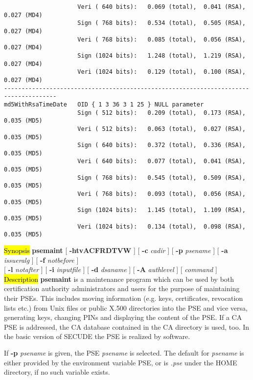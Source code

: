 {\begin{verbatim}
                     Veri ( 640 bits):   0.069 (total),  0.041 (RSA),  0.027 (MD4)  
                     Sign ( 768 bits):   0.534 (total),  0.505 (RSA),  0.027 (MD4)  
                     Veri ( 768 bits):   0.085 (total),  0.056 (RSA),  0.027 (MD4)  
                     Sign (1024 bits):   1.248 (total),  1.219 (RSA),  0.027 (MD4)  
                     Veri (1024 bits):   0.129 (total),  0.100 (RSA),  0.027 (MD4)  
-------------------------------------------------------------------------------------
md5WithRsaTimeDate   OID { 1 3 36 3 1 25 } NULL parameter
                     Sign ( 512 bits):   0.209 (total),  0.173 (RSA),  0.035 (MD5)  
                     Veri ( 512 bits):   0.063 (total),  0.027 (RSA),  0.035 (MD5)  
                     Sign ( 640 bits):   0.372 (total),  0.336 (RSA),  0.035 (MD5)  
                     Veri ( 640 bits):   0.077 (total),  0.041 (RSA),  0.035 (MD5)  
                     Sign ( 768 bits):   0.545 (total),  0.509 (RSA),  0.035 (MD5)  
                     Veri ( 768 bits):   0.093 (total),  0.056 (RSA),  0.035 (MD5)  
                     Sign (1024 bits):   1.145 (total),  1.109 (RSA),  0.035 (MD5)  
                     Veri (1024 bits):   0.134 (total),  0.098 (RSA),  0.035 (MD5)  
\end{verbatim}
}

\label{psemaint}
\hl{Synopsis}
{\bf psemaint} [ {\bf -htvACFRDTVW} ] [ {\bf -c} {\em cadir} ] [ {\bf -p} {\em psename} ] [ {\bf -a} {\em 
issueralg} ] [ {\bf -f} {\em notbefore} ] 
\\ \hspace*{1.59cm} [ {\bf -l} {\em notafter} ] [ {\bf -i} {\em inputfile} ] [ {\bf -d} {\em dsaname} ] [ {\bf -A} {\em authlevel} ] [ {\em command} ]
\hl{Description}
{\bf psemaint} is a maintenance program which can be used by both
certification authority administrators and users for the purpose of maintaining their
PSEs. This includes moving information (e.g. keys, certificates, revocation lists etc.) from Unix files
or public X.500 directories into the PSE and vice versa, generating keys, changing PINs and displaying the 
content
of the PSE. If a CA PSE is addressed, the CA database contained in the CA directory is used, too.
In the basic version of SECUDE the PSE is realized by software.

If {\bf -p} {\em psename} is given, the PSE {\em psename} is selected. The default for
{\em psename} is either provided by the environment variable PSE, or is {\em .pse} under the
HOME directory, if no such variable exists.

